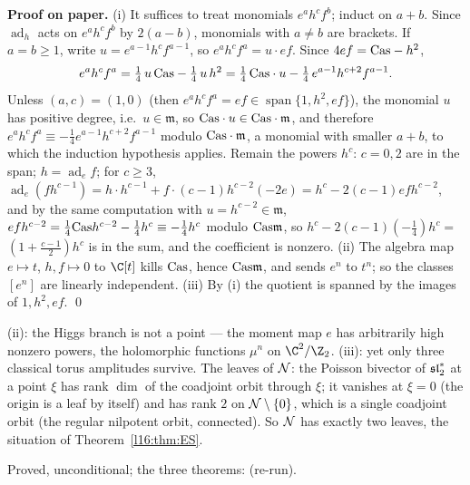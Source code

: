 \textbf{Proof on paper.} (i) It suffices to treat monomials $e^ah^cf^b$; induct on $a+b$. Since $\operatorname{ad}_h$ acts on
$e^ah^cf^b$ by $2(a-b)$, monomials with $a\ne b$ are brackets. If $a = b\ge1$, write $u = e^{a-1}h^cf^{a-1}$, so $e^ah^cf^a = u\cdot ef$. Since $4ef = \mathrm{Cas} - h^2$,
\begin{equation*}
e^ah^cf^a = \tfrac14\,u\,\mathrm{Cas} - \tfrac14\,u\,h^2 = \tfrac14\,\mathrm{Cas}\cdot u - \tfrac14\,e^{a-1}h^{c+2}f^{a-1}.
\end{equation*}
Unless $(a,c) = (1,0)$ (then $e^ah^cf^a = ef\in\operatorname{span}\{1,h^2,ef\}$), the monomial $u$ has positive degree, i.e.\
$u\in\mathfrak m$, so $\mathrm{Cas}\cdot u\in\mathrm{Cas}\cdot\mathfrak m$, and therefore
$e^ah^cf^a\equiv-\frac14e^{a-1}h^{c+2}f^{a-1}$ modulo $\mathrm{Cas}\cdot\mathfrak m$, a monomial with smaller $a+b$, to which
the induction hypothesis applies. Remain the powers $h^c$: $c = 0,2$ are in the span; $h =
\operatorname{ad}_e f$; for $c\ge3$, $\operatorname{ad}_e(fh^{c-1}) = h\cdot h^{c-1} + f\cdot(c-1)h^{c-2}(-2e) = h^c - 2(c-1)efh^{c-2}$, and by the
same computation with $u = h^{c-2}\in\mathfrak m$, $efh^{c-2} = \frac14\mathrm{Cas} h^{c-2} - \frac14h^c\equiv
-\frac14h^c$ modulo $\mathrm{Cas}\mathfrak m$, so $h^c - 2(c-1)(-\frac14)h^c =$ $(1+\frac{c-1}2)h^c$ is in the sum, and the coefficient is nonzero. (ii) The
algebra map $e\mapsto t$, $h,f\mapsto0$ to $\C[t]$ kills $\mathrm{Cas}$, hence $\mathrm{Cas}\mathfrak m$, and sends $e^n$ to
$t^n$; so the classes $[e^n]$ are linearly independent. (iii) By (i) the quotient is spanned by the images of
$1,h^2,ef$. \qed

\begin{physics}
(ii): the Higgs branch is not a point --- the moment map $e$ has arbitrarily high nonzero powers, the holomorphic functions
$\mu^n$ on $\C^2/\Z_2$. (iii): yet only three classical torus amplitudes survive. The leaves of $\mathcal{N}$: the Poisson bivector of
$\mathfrak{sl}_2^*$ at a point $\xi$ has rank $\dim$ of the coadjoint orbit through $\xi$; it vanishes at $\xi=0$ (the origin is a
leaf by itself) and has rank $2$ on $\mathcal{N}\setminus\{0\}$, which is a single coadjoint orbit (the regular nilpotent
orbit, connected). So $\mathcal{N}$ has exactly two leaves, the situation of Theorem~\ref{l16:thm:ES}.
\end{physics}

\begin{status}
Proved, unconditional; the three theorems: \lean{[propext, Classical.}\allowbreak{}\allowbreak\lean{sound]} (re-run).
\end{status}

